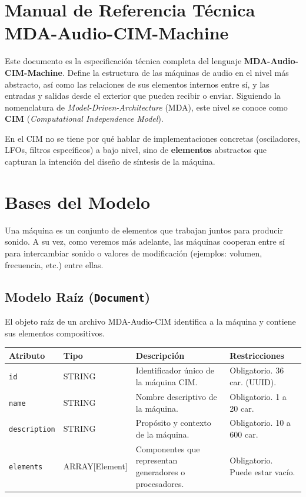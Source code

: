 \section{Manual de Referencia Técnica MDA-Audio-CIM-Machine}

Este documento es la especificación técnica completa del lenguaje \textbf{MDA-Audio-CIM-Machine}. Define la estructura de las máquinas de audio en el nivel más abstracto, así como las relaciones de sus elementos internos entre sí, y las entradas y salidas desde el exterior que pueden recibir o enviar. Siguiendo la nomenclatura de \textit{Model-Driven-Architecture} (MDA), este nivel se conoce como \textbf{CIM} (\textit{Computational Independence Model}).

En el CIM no se tiene por qué hablar de implementaciones concretas (osciladores, LFOs, filtros específicos) a bajo nivel, sino de \textbf{elementos} abstractos que capturan la intención del diseño de síntesis de la máquina.

\section{Bases del Modelo}

Una máquina es un conjunto de elementos que trabajan juntos para producir sonido. A su vez, como veremos más adelante, las máquinas cooperan entre sí para intercambiar sonido o valores de modificación (ejemplos: volumen, frecuencia, etc.) entre ellas.

\subsection{Modelo Raíz (\texttt{Document})}

El objeto raíz de un archivo MDA-Audio-CIM identifica a la máquina y contiene sus elementos compositivos.

\begin{table}[H]
\centering
\small
\begin{tabular}{@{}llp{4cm}l@{}}
\toprule
Atributo & Tipo & Descripción & Restricciones \\ \midrule
\texttt{id} & STRING & Identificador único de la máquina CIM. & Obligatorio. 36 car. (UUID). \\
\texttt{name} & STRING & Nombre descriptivo de la máquina. & Obligatorio. 1 a 20 car. \\
\texttt{description} & STRING & Propósito y contexto de la máquina. & Obligatorio. 10 a 600 car. \\
\texttt{elements} & ARRAY[Element] & Componentes que representan generadores o procesadores. & Obligatorio. Puede estar vacío. \\ \bottomrule
\end{tabular}
\end{table}

